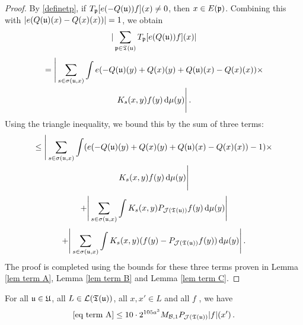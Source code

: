 \begin{proof}
    By \eqref{definetp}, if $T_{\mathfrak p}[ e(-Q(\mathfrak u))f](x) \ne 0$, then $x \in E(\mathfrak p)$. Combining this with $|e(Q(\mathfrak u)(x)-Q(x)(x))| = 1$, we obtain
    $$
        |\sum_{\mathfrak p \in \mathfrak T(\mathfrak u)} T_{\mathfrak p}[ e(Q(\mathfrak u))f](x)|
    $$
    \begin{multline*}
        = \Bigg| \sum_{s \in \sigma(\mathfrak u, x)} \int e(-Q(\mathfrak u)(y) + Q(x)(y) + Q(\mathfrak u)(x) -Q(x)(x))\times\\
        K_s(x,y)f(y) \, \mathrm{d}\mu(y) \Bigg|\,.
    \end{multline*}
    Using the triangle inequality, we bound this by the sum of three terms:
    \begin{multline}
        \label{eq term A}
        \le \Bigg| \sum_{s \in \sigma(\mathfrak u, x)} \int (e(-Q(\mathfrak u)(y) + Q(x)(y) + Q(\mathfrak u)(x) -Q(x)(x))-1)\times\\
        K_s(x,y)f(y) \, \mathrm{d}\mu(y) \Bigg|
    \end{multline}
    \begin{equation}
        \label{eq term B}
        + \Bigg| \sum_{s \in \sigma(\mathfrak u, x)} \int K_s(x,y) P_{\mathcal{J}(\mathfrak T(\mathfrak u))} f(y) \, \mathrm{d}\mu(y) \Bigg|
    \end{equation}
    \begin{equation}
        \label{eq term C}
        + \Bigg| \sum_{s \in \sigma(\mathfrak u, x)} \int K_s(x,y) (f(y) - P_{\mathcal{J}(\mathfrak T(\mathfrak u))} f(y)) \, \mathrm{d}\mu(y) \Bigg|\,.
    \end{equation}
    The proof is completed using the bounds for these three terms proven in Lemma \ref{lem term A}, Lemma \ref{lem term B} and Lemma \ref{lem term C}.
\end{proof}

\begin{lemma}
    \label{lem term A}
    For all $\mathfrak u \in \mathfrak U$, all $L \in \mathcal{L}(\mathfrak T(\mathfrak u))$, all $x, x' \in L$ and all $f$ , we have
    $$
        \eqref{eq term A} \le 10 \cdot 2^{105a^3} M_{\mathcal{B}, 1}P_{\mathcal{J}(\mathfrak T(\mathfrak u))}|f|(x')\,.
    $$
\end{lemma}

